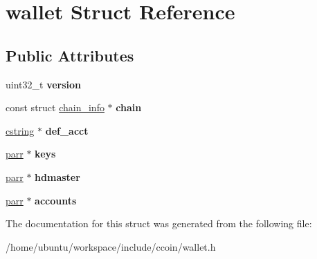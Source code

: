 \hypertarget{structwallet}{\section{wallet Struct Reference}
\label{structwallet}
}
\subsection*{Public Attributes}
\begin{DoxyCompactItemize}
\item 
\hypertarget{structwallet_af39b092e39a02ac56093f3cd2b4bd77c}{uint32\-\_\-t {\bfseries version}}\label{structwallet_af39b092e39a02ac56093f3cd2b4bd77c}

\item 
\hypertarget{structwallet_a786e7406ead1641945016722a1902d51}{const struct \hyperlink{structchain__info}{chain\-\_\-info} $\ast$ {\bfseries chain}}\label{structwallet_a786e7406ead1641945016722a1902d51}

\item 
\hypertarget{structwallet_af5ee1bc91deb9215b328c2aa2e525def}{\hyperlink{structcstring}{cstring} $\ast$ {\bfseries def\-\_\-acct}}\label{structwallet_af5ee1bc91deb9215b328c2aa2e525def}

\item 
\hypertarget{structwallet_aad2f642c895e306b9e2b016d0edc1b36}{\hyperlink{structparr}{parr} $\ast$ {\bfseries keys}}\label{structwallet_aad2f642c895e306b9e2b016d0edc1b36}

\item 
\hypertarget{structwallet_a238b922ee37a94fb851ed2f5555dae34}{\hyperlink{structparr}{parr} $\ast$ {\bfseries hdmaster}}\label{structwallet_a238b922ee37a94fb851ed2f5555dae34}

\item 
\hypertarget{structwallet_a7057f6ad55a63714ef10fbf98f459743}{\hyperlink{structparr}{parr} $\ast$ {\bfseries accounts}}\label{structwallet_a7057f6ad55a63714ef10fbf98f459743}

\end{DoxyCompactItemize}


The documentation for this struct was generated from the following file\-:\begin{DoxyCompactItemize}
\item 
/home/ubuntu/workspace/include/ccoin/wallet.\-h\end{DoxyCompactItemize}
